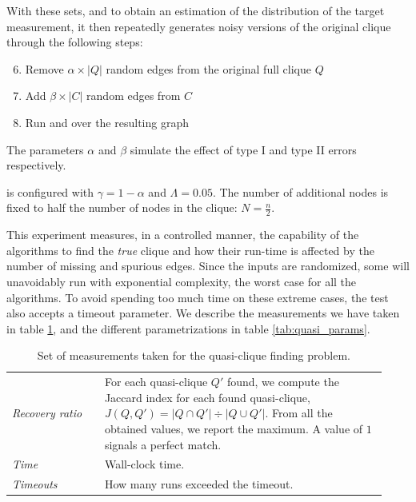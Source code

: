 With these sets, and to obtain an estimation of the distribution of the target measurement,
it then repeatedly generates noisy versions of the original clique through the following steps:

\begin{enumerate}
    \setcounter{enumi}{5}
    \item Remove $\alpha \times |Q|$ random edges from the original full clique $Q$
    \item Add $\beta \times |C|$ random edges from $C$
    \item Run \Find and \PresQ over the resulting graph
\end{enumerate}

The parameters $\alpha$ and $\beta$ simulate the effect of type I and type II errors
respectively.

\PresQ is configured with $\gamma = 1 - \alpha$ and $\Lambda = 0.05$. The number of additional nodes
is fixed to half the number of nodes in the clique: $N = \frac{n}{2}$.

This experiment measures, in a controlled manner, the capability of the
algorithms to find the \emph{true} clique and how their run-time is affected by the number of
missing and spurious edges.
Since the inputs are randomized, some will unavoidably run with exponential complexity,
the worst case for all the algorithms. To avoid spending too much time on these extreme cases,
the test also accepts a timeout parameter.
We describe the measurements we have taken in table \ref{tab:quasi_measurements}, and
the different parametrizations in table \ref{tab:quasi_params}.

\begin{table}[tbp]
    \caption{Set of measurements taken for the quasi-clique finding problem.}
    \label{tab:quasi_measurements}
    \centering
    \begin{tabular}{p{0.23\linewidth} p{0.7\linewidth}}
        \emph{Recovery ratio} & For each quasi-clique $Q'$ found, we compute the
        Jaccard index for each found quasi-clique,
        $J(Q, Q') = {|Q \cap Q'| \div |Q \cup Q'|}$.
        From all the obtained values, we report the maximum. A value of
        $1$ signals a perfect match. \\
        \emph{Time}           & Wall-clock time. \\
        \emph{Timeouts}       & How many runs exceeded the timeout. \\
    \end{tabular}
\end{table}


